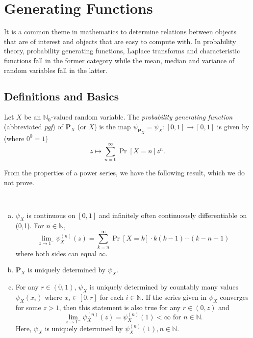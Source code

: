 \section{Generating Functions}

It is a common theme in mathematics to determine relations between objects that are of interest and objects that are easy to compute with. In probability theory, probability generating functions, Laplace transforms and characteristic functions fall in the former category while the mean, median and variance of random variables fall in the latter.

\subsection{Definitions and Basics}

\begin{definition}
    Let $X$ be an $\mathbb{N}_0$-valued random variable. The \textit{probability generating function} (abbreviated \textit{pgf}) of $\textbf{P}_X$ (or $X$) is the map $\psi_{\textbf{P}_X}=\psi_X:[0,1]\to[0,1]$ is given by (where $0^0=1$)
    $$z\mapsto \sum_{n=0}^\infty \Pr[X=n]z^n.$$
\end{definition}

From the properties of a power series, we have the following result, which we do not prove.

\begin{theorem}
\label{pgfpowerseries}
    ~\begin{enumerate}[(a)]
        \item $\psi_X$ is continuous on $[0,1]$ and infinitely often continuously differentiable on (0,1). For $n\in\mathbb{N}$,
        $$\lim_{z\to 1^-}\psi_X^{(n)}(z)=\sum_{k=n}^\infty \Pr[X=k]\cdot k(k-1)\cdots (k-n+1)$$
        where both sides can equal $\infty$.
        
        \item $\textbf{P}_X$ is uniquely determined by $\psi_X$.
        
        \item For any $r\in(0,1)$, $\psi_X$ is uniquely determined by countably many values $\psi_X(x_i)$ where $x_i\in [0,r]$ for each $i\in\mathbb{N}$. If the series given in $\psi_X$ converges for some $z>1$, then this statement is also true for any $r\in(0,z)$ and 
        $$\lim_{z\to 1^{-}} \psi_{X}^{(n)}(z)=\psi_X^{(n)}(1)<\infty\text{ for }n\in\mathbb{N}.$$
        Here, $\psi_X$ is uniquely determined by $\psi_X^{(n)}(1), n\in\mathbb{N}$.
    \end{enumerate}
\end{theorem}

